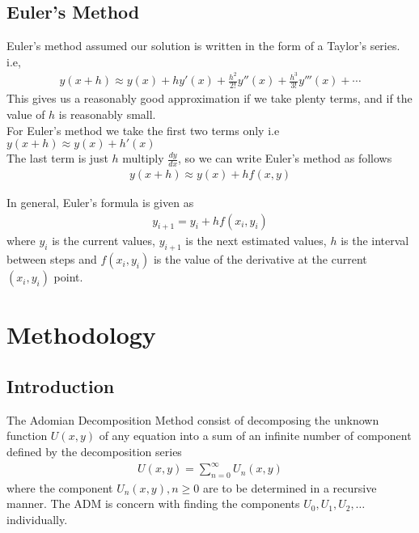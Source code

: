 \documentclass[11pt]{report}
\newcommand{\dsp}{\displaystyle}
\newcommand{\NI}{\noindent}
\newcommand{\sprime}{'}
\newcommand{\dprime}{''}
\newcommand{\tprime}{'''}
\begin{document}
	\section{Euler's Method}
	Euler's method assumed our solution is written in the form of a Taylor's series. i.e,
	\begin{eqnarray}
		y(x+h) \approx y(x) + hy\sprime(x) + \frac{h^2}{2!}y\dprime(x) + \frac{h^3}{3!}y\tprime(x) + \cdots
	\end{eqnarray}
	This gives us a reasonably good approximation if we take plenty terms, and if the value of $h$ is reasonably small. \\
	
	\NI For Euler's method we take the first two terms only i.e $\dsp y(x+h) \approx y(x) + h\sprime(x)$\\
	The last term is just $h$ multiply $\dsp\frac{dy}{dx}$, so we can write Euler's method as follows
	\begin{eqnarray}
		y(x+h) \approx y(x) + hf(x,y)
	\end{eqnarray} 

	\NI In general, Euler's formula is given as 
	\begin{eqnarray}
		y_{i+1} = y_i + hf(x_i,y_i)
	\end{eqnarray}
	where $y_i$ is the current values, $y_{i+1}$ is the next estimated values, $h$ is the interval between steps and $f(x_i,y_i)$ is the value of the derivative at the current $(x_i,y_i)$ point.
	

	
	\chapter{Methodology}
	\section{Introduction}
	The Adomian Decomposition Method consist of decomposing the unknown function $U(x,y)$ of any equation into a sum of an infinite number of component defined by the decomposition series
	\begin{eqnarray}
		U(x,y) = \sum_{n=0}^{\infty} U_n(x,y)
	\end{eqnarray}
	where the component $U_n(x,y), n\geq 0$ are to be determined in a recursive manner. The ADM is concern with finding the components $U_0, U_1, U_2,\ldots$ individually.\\
	
\end{document}
